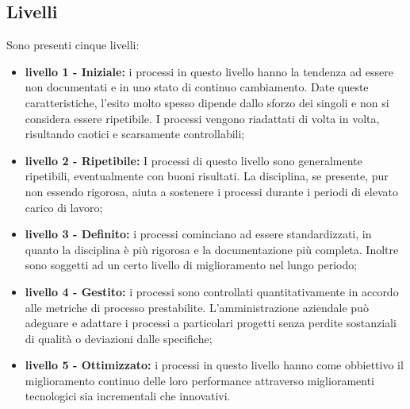 \subsection{Livelli}
Sono presenti cinque livelli:
\begin{itemize}
\item \textbf{livello 1 - Iniziale:} i processi in questo livello hanno la tendenza ad essere non documentati e in uno stato di continuo cambiamento. Date queste caratteristiche, l'esito molto spesso dipende dallo sforzo dei singoli e non si considera essere ripetibile. I processi vengono riadattati di volta in volta, risultando caotici e scarsamente controllabili;

\item \textbf{livello 2 - Ripetibile:} I processi di questo livello sono generalmente ripetibili, eventualmente con buoni risultati. La disciplina, se presente, pur non essendo rigorosa, aiuta a sostenere i processi durante i periodi di elevato carico di lavoro;

\item \textbf{livello 3 - Definito:} i processi cominciano ad essere standardizzati, in quanto la disciplina è più rigorosa e la documentazione più completa. Inoltre sono soggetti ad un certo livello di miglioramento nel lungo periodo;

\item \textbf{livello 4 - Gestito:} i processi sono controllati quantitativamente in accordo alle metriche di processo prestabilite. L'amministrazione aziendale può adeguare e adattare i processi a particolari progetti senza perdite sostanziali di qualità o deviazioni dalle specifiche;

\item \textbf{livello 5 - Ottimizzato:} i processi in questo livello hanno come obbiettivo il miglioramento continuo delle loro performance attraverso miglioramenti tecnologici sia incrementali che innovativi.
\end{itemize}
